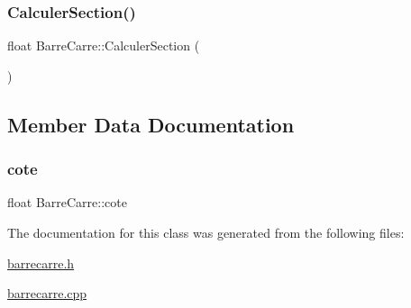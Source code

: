 \subsubsection{\texorpdfstring{Calculer\+Section()}{CalculerSection()}}
{\footnotesize\ttfamily float Barre\+Carre\+::\+Calculer\+Section (\begin{DoxyParamCaption}{ }\end{DoxyParamCaption})}



\subsection{Member Data Documentation}
\mbox{\label{class_barre_carre_aebae98f7422f75a54d1e0cf7ab0f9d72}} 
\subsubsection{\texorpdfstring{cote}{cote}}
{\footnotesize\ttfamily float Barre\+Carre\+::cote\hspace{0.3cm}{\ttfamily [private]}}



The documentation for this class was generated from the following files\+:\begin{DoxyCompactItemize}
\item 
\hyperlink{barrecarre_8h}{barrecarre.\+h}\item 
\hyperlink{barrecarre_8cpp}{barrecarre.\+cpp}\end{DoxyCompactItemize}

